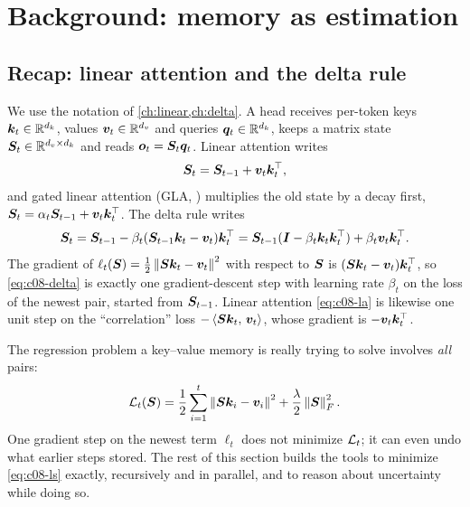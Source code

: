 \section{Background: memory as estimation}\label{sec:c08-background}

\subsection{Recap: linear attention and the delta rule}\label{sec:c08-recap}

We use the notation of \cref{ch:linear,ch:delta}. A head receives per-token keys
$\bm{k}_t\in\mathbb{R}^{d_k}$, values $\bm{v}_t\in\mathbb{R}^{d_v}$ and queries $\bm{q}_t\in\mathbb{R}^{d_k}$, keeps a matrix state
$\bm{S}_t\in\mathbb{R}^{d_v\times d_k}$ and reads $\bm{o}_t=\bm{S}_t\bm{q}_t$. Linear attention writes
\begin{equation}\label{eq:c08-la}
  \bm{S}_t = \bm{S}_{t-1} + \bm{v}_t\bm{k}_t^{\top} ,
\end{equation}
and gated linear attention (GLA, \citet{yang2024gla}) multiplies the old state by a decay first,
$\bm{S}_t = \alpha_t\bm{S}_{t-1}+\bm{v}_t\bm{k}_t^{\top}$. The delta rule \citep{c02-schlag2021linear,yang2025gdn}
writes
\begin{equation}\label{eq:c08-delta}
  \bm{S}_t = \bm{S}_{t-1} - \beta_t(\bm{S}_{t-1}\bm{k}_t-\bm{v}_t)\bm{k}_t^{\top}
        = \bm{S}_{t-1}(\bm{I}-\beta_t\bm{k}_t\bm{k}_t^{\top})+\beta_t\bm{v}_t\bm{k}_t^{\top} .
\end{equation}
The gradient of $\ell_t(\bm{S})=\tfrac12\left\lVert \bm{S}\bm{k}_t-\bm{v}_t\right\rVert^2$ with respect to $\bm{S}$ is
$(\bm{S}\bm{k}_t-\bm{v}_t)\bm{k}_t^{\top}$, so \eqref{eq:c08-delta} is exactly one gradient-descent step with
learning rate $\beta_t$ on the loss of the newest pair, started from $\bm{S}_{t-1}$. Linear attention
\eqref{eq:c08-la} is likewise one unit step on the ``correlation'' loss $-\left\langle \bm{S}\bm{k}_t,\, \bm{v}_t\right\rangle$,
whose gradient is $-\bm{v}_t\bm{k}_t^{\top}$.

The regression problem a key--value memory is really trying to solve involves \emph{all} pairs:
\begin{equation}\label{eq:c08-ls}
  \mathcal{L}_t(\bm{S}) = \frac12\sum_{i=1}^{t}\left\lVert \bm{S}\bm{k}_i-\bm{v}_i\right\rVert^2 + \frac{\lambda}{2}\left\lVert \bm{S}\right\rVert_F^2 .
\end{equation}
One gradient step on the newest term $\ell_t$ does not minimize $\mathcal{L}_t$; it can even undo what
earlier steps stored. The rest of this section builds the tools to minimize \eqref{eq:c08-ls}
exactly, recursively and in parallel, and to reason about uncertainty while doing so.

